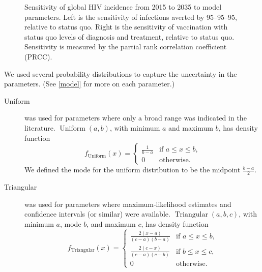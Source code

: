\documentclass{article}
\DeclareMathOperator{\Uniform}{Uniform}
\DeclareMathOperator{\Triangular}{Triangular}
\begin{document}
\begin{figure}
   \centering
   
   \caption{Sensitivity of global HIV incidence from 2015 to 2035 to
     model parameters.  Left is the sensitivity of infections averted
     by 95--95--95, relative to status quo.  Right is the sensitivity
     of vaccination with status quo levels of diagnosis and treatment,
     relative to status quo.  Sensitivity is measured by the partial
     rank correlation coefficient (PRCC).}
   \label{PRCCs}
\end{figure}

We used several probability distributions to capture the uncertainty
in the parameters.  (See \autoref{model} for more on each parameter.)
\begin{description}
\item[Uniform] was used for parameters where only a broad range was
  indicated in the literature.  $\Uniform(a, b)$, with minimum $a$ and
  maximum $b$, has density function
  \begin{equation}
    \label{uniform}
    f_{\Uniform}(x) =
    \begin{cases}
      \frac{1}{b - a} & \text{if $a \leq x \leq b$,}
      \\
      0 & \text{otherwise.}
    \end{cases}
  \end{equation}
  We defined the mode for the uniform distribution to be the midpoint
  $\frac{b - a}{2}$.

\item [Triangular] was used for parameters where maximum-likelihood
  estimates and confidence intervals (or similar) were available.
  $\Triangular(a, b, c)$, with minimum $a$, mode $b$, and maximum $c$,
  has density function
  \begin{equation}
    \label{triangular}
    f_{\Triangular}(x) =
    \begin{cases}
      \frac{2 (x - a)}{(c - a)(b - a)} & \text{if $a \leq x \leq b$,}
      \\
      \frac{2 (c - x)}{(c - a)(c - b)} & \text{if $b \leq x \leq c$,}
      \\
      0 & \text{otherwise.}
    \end{cases}
  \end{equation}


\end{description}
\end{document}
